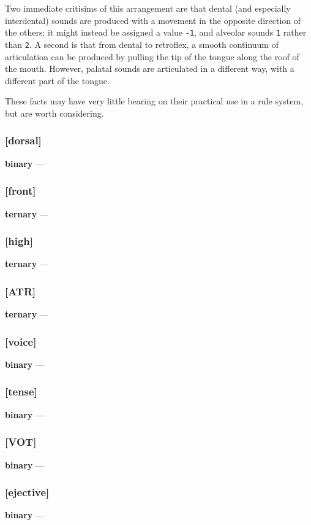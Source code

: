 \documentclass[10pt,letterpaper]{article}
\begin{document}
Two immediate critisims of this arrangement  are that dental (and especially interdental) sounds are produced with a movement in the opposite direction of the others; it might instead be assigned a value \texttt{-1}, and alveolar sounds \texttt{1} rather than \texttt{2}. A second is that from dental to retroflex, a smooth continuum of articulation can be produced by pulling the tip of the tongue along the roof of the mouth. However, palatal sounds are articulated in a different way, with a different part of the tongue.

These facts may have very little bearing on their practical use in a rule system, but are worth considering.

\subsubsection{[dorsal]}
\label{ssub:feature_dorsal}
\textbf{binary} — 

\subsubsection{[front]}
\label{ssub:feature_front}
\textbf{ternary} — 

\subsubsection{[high]}
\label{ssub:feature_high}
\textbf{ternary} — 

\subsubsection{[ATR]}
\label{ssub:feature_atr}
\textbf{ternary} — 

\subsubsection{[voice]}
\label{ssub:feature_voice}
\textbf{binary} — 

\subsubsection{[tense]}
\label{ssub:feature_tense}
\textbf{binary} — 

\subsubsection{[VOT]}
\label{ssub:feature_vot}
\textbf{binary} — 

\subsubsection{[ejective]}
\label{ssub:feature_ejective}
\textbf{binary} — 
\end{document}
